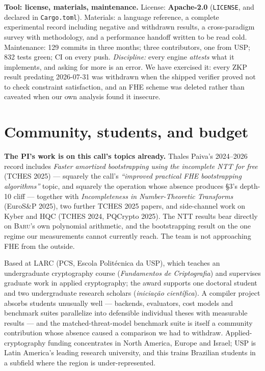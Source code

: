 \documentclass[10pt]{article}
\newcommand{\baru}{\textsc{Baru}}
\begin{document}
\noindent\textbf{Tool: license, materials, maintenance.} License:
\textbf{Apache-2.0} (\texttt{LICENSE}, and declared in \texttt{Cargo.toml}).
Materials: a language reference, a complete experimental record including
negative and withdrawn results, a cross-paradigm survey with methodology, and a
performance handoff written to be read cold. Maintenance: 129 commits in three
months; three contributors, one from USP; 832 tests green; CI on every push.
\emph{Discipline:} every engine \emph{attests} what it implements, and asking
for more is an error. We have exercised it: every ZKP result predating
2026-07-31 was withdrawn when the shipped verifier proved not to check
constraint satisfaction, and an FHE scheme was deleted rather than caveated when
our own analysis found it insecure.

\section{Community, students, and budget}

\noindent\textbf{The PI's work is on this call's topics already.} Thales
Paiva's 2024--2026 record includes \emph{Faster amortized bootstrapping using the
incomplete NTT for free} (TCHES 2025) --- squarely the call's
\emph{``improved practical FHE bootstrapping algorithms''} topic, and squarely
the operation whose absence produces §3's depth-10 cliff --- together with
\emph{Incompleteness in Number-Theoretic Transforms} (EuroS\&P 2025), two
further TCHES 2025 papers, and side-channel work on Kyber and HQC (TCHES 2024,
PQCrypto 2025). The NTT results bear directly on \baru{}'s own polynomial
arithmetic, and the bootstrapping result on the one regime our measurements
cannot currently reach. The team is not approaching FHE from the outside.

\medskip
Based at LARC (PCS, Escola Politécnica da USP), which teaches an undergraduate
cryptography course (\emph{Fundamentos de Criptografia}) and supervises graduate
work in applied cryptography; the award supports one doctoral student and
two undergraduate research scholars (\emph{iniciação científica}). A compiler project absorbs students unusually
well --- backends, evaluators, cost models and benchmark suites parallelize into
defensible individual theses with measurable results --- and the
matched-threat-model benchmark suite is itself a community contribution whose
absence caused a comparison we had to withdraw. Applied-cryptography funding
concentrates in North America, Europe and Israel; USP is Latin America's leading
research university, and this trains Brazilian students in a subfield where the
region is under-represented.
\end{document}
